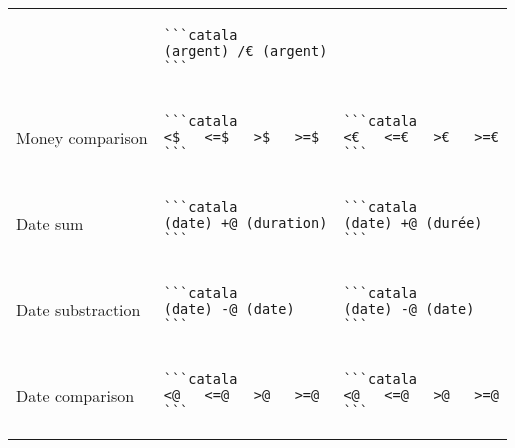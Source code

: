 \documentclass[a3paper,landscape]{article}
\begin{document}
\begin{multicols*}{2}
\begin{center}
\begin{tabular}{p{}p{}p{}}
&
\vspace*{-1.75em}
\begin{verbatim}
```catala
(argent) /€ (argent)
```
\end{verbatim}
\vspace*{-1.75em}
\\
Money comparison&
\vspace*{-1.75em}
\begin{verbatim}
```catala
<$   <=$   >$   >=$
```
\end{verbatim}
\vspace*{-1.75em}
&
\vspace*{-1.75em}
\begin{verbatim}
```catala
<€   <=€   >€   >=€
```
\end{verbatim}
\vspace*{-1.75em}
\\
Date sum&
\vspace*{-1.75em}
\begin{verbatim}
```catala
(date) +@ (duration)
```
\end{verbatim}
\vspace*{-1.75em}
&
\vspace*{-1.75em}
\begin{verbatim}
```catala
(date) +@ (durée)
```
\end{verbatim}
\vspace*{-1.75em}
\\
Date substraction&
\vspace*{-1.75em}
\begin{verbatim}
```catala
(date) -@ (date)
```
\end{verbatim}
\vspace*{-1.75em}
&
\vspace*{-1.75em}
\begin{verbatim}
```catala
(date) -@ (date)
```
\end{verbatim}
\vspace*{-1.75em}
\\
Date comparison&
\vspace*{-1.75em}
\begin{verbatim}
```catala
<@   <=@   >@   >=@
```
\end{verbatim}
\vspace*{-1.75em}
&
\vspace*{-1.75em}
\begin{verbatim}
```catala
<@   <=@   >@   >=@
```
\end{verbatim}

\end{tabular}
\end{center}
\end{multicols*}
\end{document}
